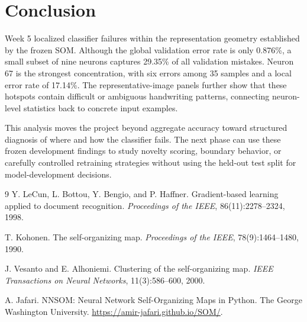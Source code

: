 \documentclass[11pt]{article}
\begin{document}
\section{Conclusion}
Week 5 localized classifier failures within the representation geometry established by the frozen SOM. Although the global validation error rate is only 0.876\%, a small subset of nine neurons captures 29.35\% of all validation mistakes. Neuron 67 is the strongest concentration, with six errors among 35 samples and a local error rate of 17.14\%. The representative-image panels further show that these hotspots contain difficult or ambiguous handwriting patterns, connecting neuron-level statistics back to concrete input examples.

This analysis moves the project beyond aggregate accuracy toward structured diagnosis of where and how the classifier fails. The next phase can use these frozen development findings to study novelty scoring, boundary behavior, or carefully controlled retraining strategies without using the held-out test split for model-development decisions.

\begin{thebibliography}{9}
Y. LeCun, L. Bottou, Y. Bengio, and P. Haffner.
\newblock Gradient-based learning applied to document recognition.
\newblock \emph{Proceedings of the IEEE}, 86(11):2278--2324, 1998.

T. Kohonen.
\newblock The self-organizing map.
\newblock \emph{Proceedings of the IEEE}, 78(9):1464--1480, 1990.

J. Vesanto and E. Alhoniemi.
\newblock Clustering of the self-organizing map.
\newblock \emph{IEEE Transactions on Neural Networks}, 11(3):586--600, 2000.

A. Jafari.
\newblock NNSOM: Neural Network Self-Organizing Maps in Python.
\newblock The George Washington University. \url{https://amir-jafari.github.io/SOM/}.
\end{thebibliography}
\end{document}
